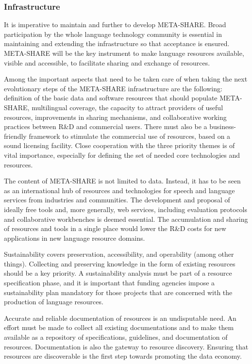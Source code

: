 \documentclass[10pt, plain]{../../metanetpaper}
\begin{document}
\begin{multicols}{2}
\subsubsection{Infrastructure}
\label{sec:infrastructure}

It is imperative to maintain and further to develop META-SHARE. Broad participation by the whole language technology community is essential in maintaining and extending the infrastructure so that acceptance is ensured. META-SHARE will be the key instrument to make language resources available, visible and accessible, to facilitate sharing and exchange of resources.

Among the important aspects that need to be taken care of when taking the next evolutionary steps of the META-SHARE infrastructure are the following: definition of the basic data and software resources that should populate META-SHARE, multilingual coverage, the capacity to attract providers of useful resources, improvements in sharing mechanisms, and collaborative working practices between R\&D and commercial users. There must also be a business-friendly framework to stimulate the commercial use of resources, based on a sound licensing facility. Close cooperation with the three priority themes is of vital importance, especially for defining the set of needed core technologies and resources.

The content of META-SHARE is not limited to data. Instead, it has to be seen as an international hub of resources and technologies for speech and language services from industries and communities. The development and proposal of ideally free tools and, more generally, web services, including evaluation protocols and collaborative workbenches is deemed essential. The accumulation and sharing of resources and tools in a single place would lower the R\&D costs for new applications in new language resource domains.

Sustainability covers preservation, accessibility, and operability (among other things). Collecting and preserving knowledge in the form of existing resources should be a key priority. A sustainability analysis must be part of a resource specification phase, and it is important that funding agencies impose a sustainability plan mandatory for those projects that are concerned with the production of language resources.

Accurate and reliable documentation of resources is an undisputable need. An effort must be made to collect all existing documentations and to make them available as a repository of specifications, guidelines, and documentation of resources. Documentation is also the gateway to resource discovery. Ensuring that resources are discoverable is the first step towards promoting the data economy. 


\end{multicols}
\end{document}
